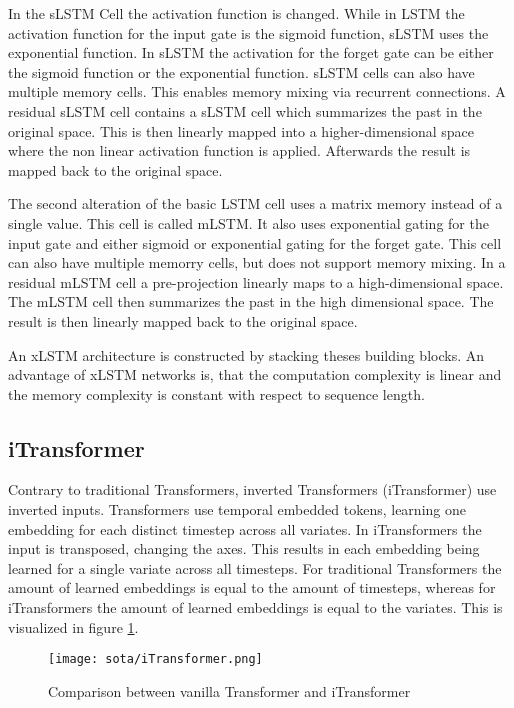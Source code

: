 \documentclass[class=scrbook, crop=false]{standalone}
\begin{document}
In the sLSTM Cell the activation function is changed. While in LSTM the activation function for the input gate is the sigmoid function, sLSTM uses the exponential function. In sLSTM the activation for the forget gate can be either the sigmoid function or the exponential function. sLSTM cells can also have multiple memory cells. This enables memory mixing via recurrent connections. A residual sLSTM cell contains a sLSTM  cell which summarizes the past in the original space. This is then linearly mapped into a higher-dimensional  space where the non linear activation function is applied. Afterwards the result is mapped back to the original space.

The second alteration of the basic LSTM cell uses a matrix memory instead of a single value. This cell is called mLSTM. It also uses exponential gating for the input gate and either sigmoid or exponential gating for the forget gate. This cell can also have multiple memorry cells, but does not support memory mixing. In a residual mLSTM cell a pre-projection linearly maps to a high-dimensional space. The mLSTM cell then summarizes the past in the high dimensional space. The result is then linearly mapped back to the original space.

An xLSTM architecture is constructed by stacking theses building blocks. An advantage of xLSTM networks is, that the computation complexity is linear and the memory complexity is constant with respect to sequence length. \cite{beckXLSTMExtendedLong2024}



\subsection{iTransformer}
\label{Section::iTransformer}

Contrary to traditional Transformers, inverted Transformers (iTransformer) use inverted inputs. Transformers use temporal embedded tokens, learning one embedding for each distinct timestep across all variates. In iTransformers the input is transposed, changing the axes. This results in each embedding being learned for a single variate across all timesteps. For traditional Transformers the amount of learned embeddings is equal to the amount of timesteps, whereas for iTransformers the amount of learned embeddings is equal to the variates. This is visualized in figure \ref{fig::iTransformer}.

\begin{figure}[ht]
            \centering
            \texttt{[image: sota/iTransformer.png]}
            \caption[Comparison between vanilla Transformer and iTransformer \cite{liuITransformerInvertedTransformers2023}]{Comparison between vanilla Transformer and iTransformer \cite{liuITransformerInvertedTransformers2023}}
            \label{fig::iTransformer}
 \end{figure}
 
\end{document}
